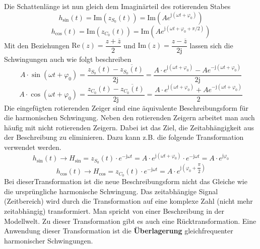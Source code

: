 Die Schattenlänge ist nun gleich dem Imaginärteil des rotierenden Stabes
\begin{equation}
\boxed{h_{\text{sin}}\left(t\right)=\text{Im}\left(z_{S_0}\left(t\right)\right)=\text{Im}\left(Ae^{\text{j}\left(\omega t+\varphi_0\right)}\right)}
\end{equation}
\begin{equation}
\boxed{h_{\text{cos}}\left(t\right)=\text{Im}\left(z_{C_0}\left(t\right)\right)=\text{Im}\left(Ae^{\text{j}\left(\omega t+\varphi_0+\pi/2\right)}\right)}
\end{equation}
Mit den Beziehungen $\text{Re}\left(z\right)=\dfrac{z+\overline{z}}{2}$ und $\text{Im}\left(z\right)=\dfrac{z-\overline{z}}{2\text{j}}$ lassen sich die Schwingungen auch wie folgt beschreiben
\begin{equation} 
\boxed{A\cdot \sin\left(\omega t+\varphi_0\right)=\dfrac{z_{S_0}\left(t\right)-\overline{z_{S_0}\left(t\right)}}{2\text{j}}=\dfrac{A\cdot e^{\text{j}\left(\omega t+\varphi_0\right)}-Ae^{-\text{j}\left(\omega t+\varphi_0\right)}}{2\text{j}}}
\end{equation} 
\begin{equation} 
\boxed{A\cdot \cos\left(\omega t+\varphi_0\right)=\dfrac{z_{C_0}\left(t\right)-\overline{z_{C_0}\left(t\right)}}{2\text{j}}=\dfrac{A\cdot e^{\text{j}\left(\omega t+\varphi_0\right)}+Ae^{-\text{j}\left(\omega t+\varphi_0\right)}}{2}}
\end{equation} 
Die eingefügten rotierenden Zeiger sind eine äquivalente Beschreibungsform für die harmonischen Schwingung. Neben den rotierenden Zeigern arbeitet man auch häufig mit nicht rotierenden Zeigern. Dabei ist das Ziel, die Zeitabhängigkeit aus der Beschreibung zu eliminieren. Dazu kann z.B. die folgende Transformation verwendet werden.
\begin{equation}
\boxed{h_{\text{sin}}\left(t\right)\longrightarrow H_{\text{sin}}=z_{S_0}\left(t\right)\cdot e^{-\text{j}\omega t}=A\cdot e^{\text{j}\left(\omega t+\varphi_0\right)}\cdot e^{-\text{j}\omega t}=A\cdot e^{\text{j}\varphi_0}}
\end{equation}
\begin{equation}
\boxed{h_{\text{cos}}\left(t\right)\longrightarrow H_{\text{cos}}=z_{C_0}\left(t\right)\cdot e^{-\text{j}\omega t}=A\cdot e^{\text{j}\left(\varphi_0+\dfrac{\pi}{2}\right)}}
\end{equation}
Bei dieserTransformation ist die neue Beschreibungsform nicht das Gleiche wie die ursprüngliche harmonische Schwingung. Das zeitabhängige Signal (Zeitbereich) wird durch die Transformation auf eine komplexe Zahl (nicht mehr zeitabhängig) transformiert. Man spricht von einer Beschreibung in der Modellwelt. Zu dieser Transformation gibt es auch eine Rücktransformation. Eine Anwendung dieser Transformation ist die \textbf{Überlagerung} gleichfrequenter harmonischer Schwingungen.
